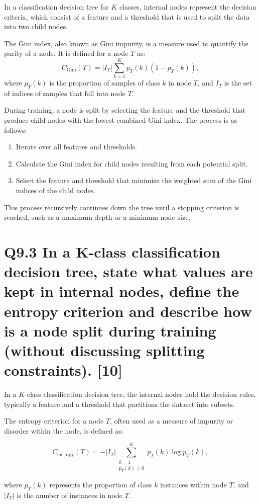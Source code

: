\documentclass[11pt]{article}
\begin{document}
In a classification decision tree for \( K \) classes, internal nodes represent the decision criteria, which consist of a feature and a threshold that is used to split the data into two child nodes.

The Gini index, also known as Gini impurity, is a measure used to quantify the purity of a node. It is defined for a node \( T \) as:
\[
C_{\text{Gini}}(T) = |I_T| \sum_{k=1}^K p_T(k) (1 - p_T(k)),
\]
where \( p_T(k) \) is the proportion of samples of class \( k \) in node \( T \), and \( I_T \) is the set of indices of samples that fall into node \( T \).

During training, a node is split by selecting the feature and the threshold that produce child nodes with the lowest combined Gini index. The process is as follows:
\begin{enumerate}
    \item Iterate over all features and thresholds.
    \item Calculate the Gini index for child nodes resulting from each potential split.
    \item Select the feature and threshold that minimize the weighted sum of the Gini indices of the child nodes.
\end{enumerate}
This process recursively continues down the tree until a stopping criterion is reached, such as a maximum depth or a minimum node size.

\section{Q9.3 In a K-class classification decision tree, state what values are kept in internal nodes, define the entropy criterion and describe how is a node split during training (without discussing splitting constraints). [10]}


In a \( K \)-class classification decision tree, the internal nodes hold the decision rules, typically a feature and a threshold that partitions the dataset into subsets.

The entropy criterion for a node \( T \), often used as a measure of impurity or disorder within the node, is defined as:

\[
C_{\text{entropy}}(T) = -|I_T| \sum_{\substack{k=1 \\ p_T(k) \neq 0}}^K p_T(k) \log p_T(k),
\]

where \( p_T(k) \) represents the proportion of class \( k \) instances within node \( T \), and \( |I_T| \) is the number of instances in node \( T \).
\end{document}
